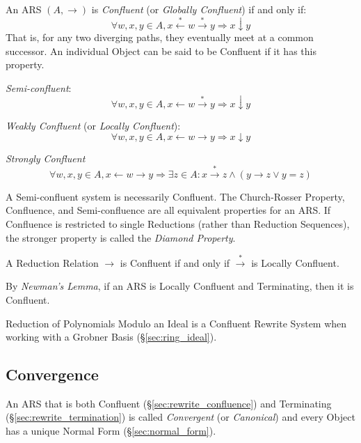 An ARS $(A, \rightarrow)$ is \emph{Confluent} (or \emph{Globally
  Confluent}) if and only if:
\[
  \forall w,x,y \in A,
  x \stackrel{*}\leftarrow w \stackrel{*}\rightarrow y
  \Rightarrow x \downarrow y
\]
That is, for any two diverging paths, they eventually meet at a common
successor. An individual Object can be said to be Confluent if it has
this property.

\emph{Semi-confluent}:
\[
  \forall w,x,y \in A,
  x \leftarrow w \stackrel{*}\rightarrow y
  \Rightarrow x \downarrow y
\]

\emph{Weakly Confluent} (or \emph{Locally Confluent}):
\[
  \forall w,x,y \in A,
  x \leftarrow w \rightarrow y \Rightarrow x \downarrow y
\]

\emph{Strongly Confluent}
\[
  \forall w,x,y \in A,
  x \leftarrow w \rightarrow y \Rightarrow
  \exists z \in A : x \stackrel{*}\rightarrow z \wedge
  (y \rightarrow z \vee y = z)
\]

A Semi-confluent system is necessarily Confluent. The Church-Rosser
Property, Confluence, and Semi-confluence are all equivalent
properties for an ARS. If Confluence is restricted to single
Reductions (rather than Reduction Sequences), the stronger property is
called the \emph{Diamond Property}.

A Reduction Relation $\rightarrow$ is Confluent if and only if
$\stackrel{*}\rightarrow$ is Locally Confluent.

By \emph{Newman's Lemma}, if an ARS is Locally Confluent and
Terminating, then it is Confluent.

Reduction of Polynomials Modulo an Ideal is a Confluent Rewrite System
when working with a Grobner Basis (\S\ref{sec:ring_ideal}).



\subsection{Convergence}\label{sec:rewrite_convergence}

An ARS that is both Confluent (\S\ref{sec:rewrite_confluence}) and
Terminating (\S\ref{sec:rewrite_termination}) is called \emph{Convergent} (or
\emph{Canonical}) and every Object has a unique Normal Form
(\S\ref{sec:normal_form}).



